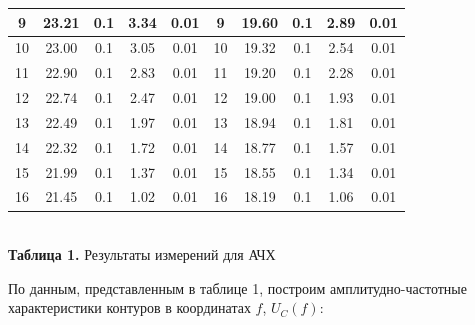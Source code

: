 \documentclass[a4paper,12pt]{article} %
\begin{document}
\begin{center}
\begin{tabular}{ccccc||c|c|c|c|c|}
		\multicolumn{1}{|c|}{9}   & \multicolumn{1}{c|}{23.21}     & \multicolumn{1}{c|}{0.1}             & \multicolumn{1}{c|}{3.34}   & 0.01                  & 9   & 19.60     & 0.1             & 2.89  & 0.01          \\ \hline
		\multicolumn{1}{|c|}{10}  & \multicolumn{1}{c|}{23.00}     & \multicolumn{1}{c|}{0.1}             & \multicolumn{1}{c|}{3.05}   & 0.01                  & 10  & 19.32   & 0.1             & 2.54 & 0.01          \\ \hline
		\multicolumn{1}{|c|}{11}  & \multicolumn{1}{c|}{22.90}     & \multicolumn{1}{c|}{0.1}             & \multicolumn{1}{c|}{2.83}   & 0.01                  & 11  & 19.20   & 0.1             & 2.28 & 0.01          \\ \hline
		\multicolumn{1}{|c|}{12}  & \multicolumn{1}{c|}{22.74}     & \multicolumn{1}{c|}{0.1}             & \multicolumn{1}{c|}{2.47}   & 0.01                  & 12  & 19.00   & 0.1             & 1.93  & 0.01          \\ \hline
		\multicolumn{1}{|c|}{13}  & \multicolumn{1}{c|}{22.49}       & \multicolumn{1}{c|}{0.1}             & \multicolumn{1}{c|}{1.97}   & 0.01                  & 13  & 18.94   & 0.1             & 1.81 & 0.01          \\ \hline
		\multicolumn{1}{|c|}{14}  & \multicolumn{1}{c|}{22.32}     & \multicolumn{1}{c|}{0.1}             & \multicolumn{1}{c|}{1.72}   & 0.01                  & 14  & 18.77   & 0.1             & 1.57 & 0.01          \\ \hline
		\multicolumn{1}{|c|}{15}  & \multicolumn{1}{c|}{21.99}     & \multicolumn{1}{c|}{0.1}             & \multicolumn{1}{c|}{1.37}   & 0.01                  & 15  & 18.55   & 0.1             & 1.34 & 0.01          \\ \hline
		\multicolumn{1}{|c|}{16}  & \multicolumn{1}{c|}{21.45}     & \multicolumn{1}{c|}{0.1}             & \multicolumn{1}{c|}{1.02}   & 0.01                  & 16  & 18.19   & 0.1             & 1.06 & 0.01          \\ \hline
	\end{tabular} \\
\hfill \break \textbf {Таблица 1.} Результаты измерений для АЧХ \\
\end{center}

\hfill \break По данным, представленным в таблице 1, построим амплитудно-частотные характеристики контуров в координатах $f$, $U_{C}(f)$:
\end{document}
